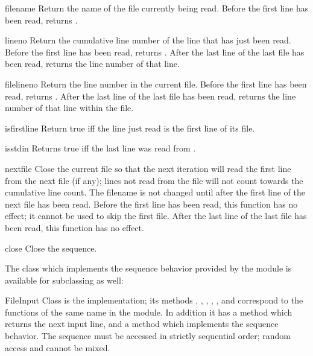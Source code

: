 \begin{funcdesc}{filename}{}
  Return the name of the file currently being read.  Before the first
  line has been read, returns .
\end{funcdesc}

\begin{funcdesc}{lineno}{}
  Return the cumulative line number of the line that has just been
  read.  Before the first line has been read, returns .  After
  the last line of the last file has been read, returns the line
  number of that line.
\end{funcdesc}

\begin{funcdesc}{filelineno}{}
  Return the line number in the current file.  Before the first line
  has been read, returns .  After the last line of the last
  file has been read, returns the line number of that line within the
  file.
\end{funcdesc}

\begin{funcdesc}{isfirstline}{}
  Return true iff the line just read is the first line of its file.
\end{funcdesc}

\begin{funcdesc}{isstdin}{}
  Returns true iff the last line was read from .
\end{funcdesc}

\begin{funcdesc}{nextfile}{}
  Close the current file so that the next iteration will read the
  first line from the next file (if any); lines not read from the file
  will not count towards the cumulative line count.  The filename is
  not changed until after the first line of the next file has been
  read.  Before the first line has been read, this function has no
  effect; it cannot be used to skip the first file.  After the last
  line of the last file has been read, this function has no effect.
\end{funcdesc}

\begin{funcdesc}{close}{}
  Close the sequence.
\end{funcdesc}


The class which implements the sequence behavior provided by the
module is available for subclassing as well:

\begin{classdesc}{FileInput}{}
  Class  is the implementation; its methods
  , , ,
  , ,  and
   correspond to the functions of the same name in the
  module.  In addition it has a  method which
  returns the next input line, and a  method
  which implements the sequence behavior.  The sequence must be
  accessed in strictly sequential order; random access and
   cannot be mixed.
\end{classdesc}

